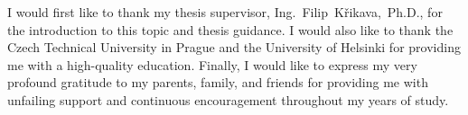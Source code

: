 I would first like to thank my thesis supervisor, Ing.~Filip~Křikava,~Ph.D.,
for the introduction to this topic and thesis guidance.
I would also like to thank the Czech Technical University in Prague and
the University of Helsinki for providing me with a high-quality education.
Finally, I would like to express my very profound gratitude to my parents, family, and friends
for providing me with unfailing support and continuous encouragement throughout my years of study.